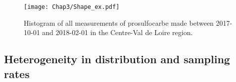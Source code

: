 \begin{figure}[ht]
    \centering
    \texttt{[image: Chap3/Shape\_ex.pdf]}
    \caption{Histogram of all measurements of prosulfocarbe made between 2017-10-01 and 2018-02-01 in the Centre-Val de Loire region.}
    \label{fig:shape_ex}
\end{figure}

\subsection{Heterogeneity in distribution and sampling rates}




